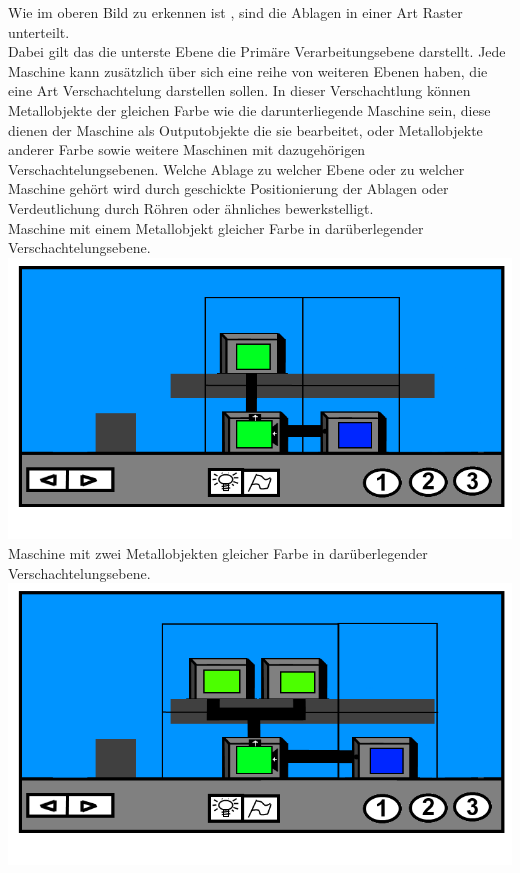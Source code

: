 \documentclass{scrartcl}
\begin{document}
\begin{description}
		\begin{minipage}{1\textwidth}
			Wie im oberen Bild zu erkennen ist , sind die Ablagen in einer Art Raster unterteilt.\\
			Dabei gilt das die unterste Ebene die Primäre Verarbeitungsebene darstellt. Jede Maschine kann zusätzlich über sich eine reihe von weiteren Ebenen haben, die eine Art Verschachtelung darstellen sollen. In dieser Verschachtlung können Metallobjekte der gleichen Farbe wie die darunterliegende Maschine sein, diese dienen der Maschine als Outputobjekte die sie bearbeitet, oder Metallobjekte anderer Farbe sowie weitere Maschinen mit dazugehörigen Verschachtelungsebenen. Welche Ablage zu welcher Ebene oder zu welcher Maschine gehört wird durch geschickte Positionierung der Ablagen oder Verdeutlichung durch Röhren oder ähnliches bewerkstelligt.\\
			Maschine mit einem Metallobjekt gleicher Farbe in darüberlegender Verschachtelungsebene.\\ 
			\includegraphics[scale=0.5]{assets/LevelVerarbeitungBsp}\\
			Maschine mit zwei Metallobjekten gleicher Farbe in darüberlegender Verschachtelungsebene.\\
			\includegraphics[scale=0.5]{assets/LevelBsp2Out}\\
		\end{minipage}
		

\end{description}
\end{document}
